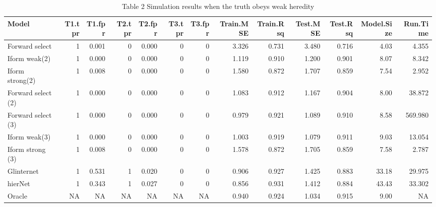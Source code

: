 \documentclass[11pt,]{book}
\theoremstyle{definition}
\theoremstyle{definition}
\theoremstyle{remark}
\begin{document}
\begin{table}

\caption{\label{tab:Chap3sim2}Table 2 Simulation results when the truth obeys weak heredity}
\centering
\begin{tabular}[t]{lrrrrrrrrrrrr}
\toprule
Model & T1.tpr & T1.fpr & T2.tpr & T2.fpr & T3.tpr & T3.fpr & Train.MSE & Train.Rsq & Test.MSE & Test.Rsq & Model.Size & Run.Time\\
\midrule
Forward select & 1 & 0.001 & 0 & 0.000 & 0 & 0 & 3.326 & 0.731 & 3.480 & 0.716 & 4.03 & 4.355\\
Iform weak(2) & 1 & 0.000 & 0 & 0.000 & 0 & 0 & 1.119 & 0.910 & 1.200 & 0.901 & 8.07 & 8.342\\
Iform strong(2) & 1 & 0.008 & 0 & 0.000 & 0 & 0 & 1.580 & 0.872 & 1.707 & 0.859 & 7.54 & 2.952\\
Forward select (2) & 1 & 0.000 & 0 & 0.000 & 0 & 0 & 1.083 & 0.912 & 1.167 & 0.904 & 8.00 & 38.872\\
Forward select (3) & 1 & 0.000 & 0 & 0.000 & 0 & 0 & 0.979 & 0.921 & 1.089 & 0.910 & 8.58 & 569.980\\
\addlinespace
Iform weak(3) & 1 & 0.000 & 0 & 0.000 & 0 & 0 & 1.003 & 0.919 & 1.079 & 0.911 & 9.03 & 13.054\\
Iform strong (3) & 1 & 0.008 & 0 & 0.000 & 0 & 0 & 1.578 & 0.872 & 1.705 & 0.859 & 7.58 & 2.787\\
Glinternet & 1 & 0.531 & 1 & 0.020 & 0 & 0 & 0.906 & 0.927 & 1.425 & 0.883 & 33.18 & 29.975\\
hierNet & 1 & 0.343 & 1 & 0.027 & 0 & 0 & 0.856 & 0.931 & 1.412 & 0.884 & 43.43 & 33.302\\
Oracle & NA & NA & NA & NA & NA & NA & 0.940 & 0.924 & 1.034 & 0.915 & 9.00 & NA\\
\bottomrule
\end{tabular}
\end{table}
\end{document}
